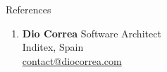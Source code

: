\documentclass{resume} %
\begin{document}
\begin{rSection}{\faComments \hspace{0.5mm} References}

    \begin{enumerate}
        {common references}
        
        \item \textbf{Dio Correa} \hfill Software Architect\\
            Inditex, Spain\\
            \faEnvelope \hspace{0.5mm} \href{mailto:contact@diocorrea.com}{contact@diocorrea.com}
    \end{enumerate}

\end{rSection}
\end{document}
